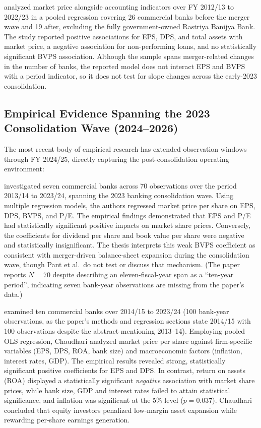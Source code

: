 \citet{bhattarai2024mps} analyzed market price alongside accounting indicators over FY 2012/13 to 2022/23 in a pooled regression covering 26 commercial banks before the merger wave and 19 after, excluding the fully government-owned Rastriya Banijya Bank. The study reported positive associations for EPS, DPS, and total assets with market price, a negative association for non-performing loans, and no statistically significant BVPS association. Although the sample spans merger-related changes in the number of banks, the reported model does not interact EPS and BVPS with a period indicator, so it does not test for slope changes across the early-2023 consolidation.

\subsection{Empirical Evidence Spanning the 2023 Consolidation Wave (2024--2026)}
\label{subsec:consolidation_studies}

The most recent body of empirical research has extended observation windows through FY 2024/25, directly capturing the post-consolidation operating environment:

\citet{pant2024} investigated seven commercial banks across 70 observations over the period 2013/14 to 2023/24, spanning the 2023 banking consolidation wave. Using multiple regression models, the authors regressed market price per share on EPS, DPS, BVPS, and P/E. The empirical findings demonstrated that EPS and P/E had statistically significant positive impacts on market share prices. Conversely, the coefficients for dividend per share and book value per share were negative and statistically insignificant. The thesis interprets this weak BVPS coefficient as consistent with merger-driven balance-sheet expansion during the consolidation wave, though Pant et al.\ do not test or discuss that mechanism. (The paper reports $N = 70$ despite describing an eleven-fiscal-year span as a ``ten-year period'', indicating seven bank-year observations are missing from the paper's data.)

\citet{chaudhari2025} examined ten commercial banks over 2014/15 to 2023/24 (100 bank-year observations, as the paper's methods and regression sections state 2014/15 with 100 observations despite the abstract mentioning 2013--14). Employing pooled OLS regression, Chaudhari analyzed market price per share against firm-specific variables (EPS, DPS, ROA, bank size) and macroeconomic factors (inflation, interest rates, GDP). The empirical results revealed strong, statistically significant positive coefficients for EPS and DPS. In contrast, return on assets (ROA) displayed a statistically significant \textit{negative} association with market share prices, while bank size, GDP and interest rates failed to attain statistical significance, and inflation was significant at the 5\% level ($p = 0.037$). Chaudhari concluded that equity investors penalized low-margin asset expansion while rewarding per-share earnings generation.


